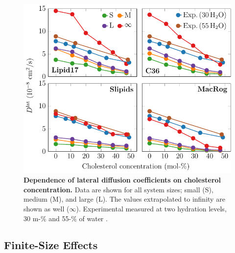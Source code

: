 \documentclass[journal=jpcbfk]{achemso}
\begin{document}
\begin{figure}[htb!]
    \centering
    \includegraphics[width=0.9\linewidth]{../FIGS/d_vs_chol.pdf}
    \caption{\label{SIfig:dvschol}%
     \textbf{Dependence of lateral diffusion coefficients on cholesterol concentration.} Data are shown for all system sizes; small (S), medium (M), and large (L). The values extrapolated to infinity are shown as well ($\infty$). Experimental measured at two hydration levels, 30 m-\% and 55-\% of water \cite{filippov2003effect,filippov2003influence}.
    }
\end{figure}

\clearpage
\subsection{Finite-Size Effects}
\end{document}
